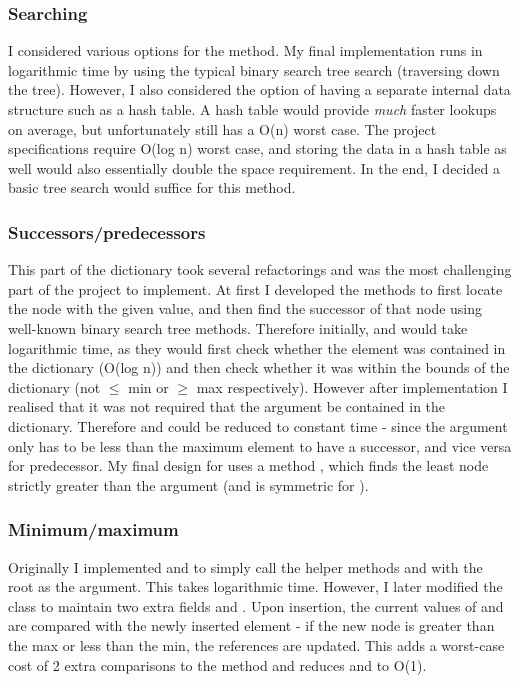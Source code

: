 \subsubsection{Searching}
I considered various options for the  method. My final implementation runs in logarithmic time by using the typical binary search tree search (traversing down the tree). However, I also considered the option of having a separate internal data structure such as a hash table. A hash table would provide \textit{much} faster lookups on average, but unfortunately still has a O(n) worst case. The project specifications require O(log n) worst case, and storing the data in a hash table as well would also essentially double the space requirement. In the end, I decided a basic tree search would suffice for this method.
 
\subsubsection{Successors/predecessors}
This part of the dictionary took several refactorings and was the most challenging part of the project to implement. At first I developed the methods to first locate the node with the given value, and then find the successor of that node using well-known binary search tree methods. Therefore initially,  and  would take logarithmic time, as they would first check whether the element was contained in the dictionary (O(log n)) and then check whether it was within the bounds of the dictionary (not $\leq$ min or $\geq$ max respectively). However after implementation I realised that it was not required that the argument be contained in the dictionary. Therefore  and  could be reduced to constant time - since the argument only has to be less than the maximum element to have a successor, and vice versa for predecessor. My final design for  uses a method , which finds the least node strictly greater than the argument (and  is symmetric for ).

\subsubsection{Minimum/maximum}
Originally I implemented  and  to simply call the helper methods  and  with the root as the argument. This takes logarithmic time. However, I later modified the class to maintain two extra fields  and . Upon insertion, the current values of  and  are compared with the newly inserted element - if the new node is greater than the max or less than the min, the references are updated. This adds a worst-case cost of 2  extra comparisons to the  method and reduces  and  to O(1).

